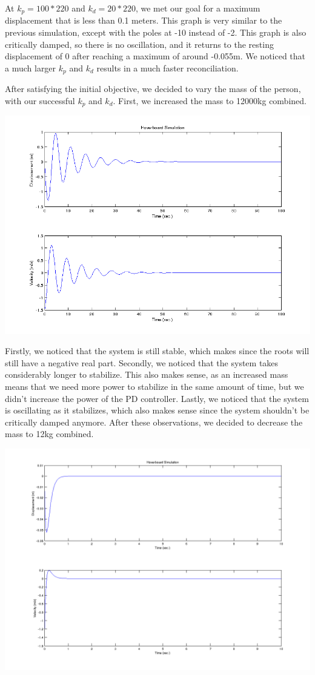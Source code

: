 \documentclass[titlepage]{article}
\begin{document}
At $k_p = 100*220$ and $k_d = 20*220$, we met our goal for a maximum displacement that is less than 0.1 meters. This graph is very similar to the previous simulation, except with the poles at -10 instead of -2. This graph is also critically damped, so there is no oscillation, and it returns to the resting displacement of 0 after reaching a maximum of around -0.055m. We noticed that a much larger $k_p$ and $k_d$ results in a much faster reconciliation.

After satisfying the initial objective, we decided to vary the mass of the person, with our successful $k_p$ and $k_d$. First, we increased the mass to 12000kg combined.

\includegraphics[scale=0.66]{guymass12000k_p100120k_d20120.png}

Firstly, we noticed that the system is still stable, which makes since the roots will still have a
negative real part. Secondly, we noticed that the system takes considerably longer to stabilize. This also makes sense, as an increased mass means that we need more power to stabilize in the same amount of time, but we didn't increase the power of the PD controller. Lastly, we noticed
that the system is oscillating as it stabilizes, which also makes sense since the system shouldn't be critically damped anymore. After these observations, we decided to decrease the mass to 12kg combined.

\includegraphics[scale=0.5]{mguy12k_p100120k_d20120.png}
\end{document}
